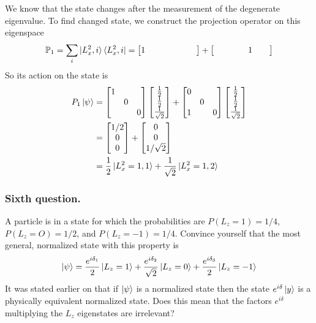 \documentclass[../../../main.tex]{subfiles}
\begin{document}
We know that the state changes after the measurement of the degenerate eigenvalue.
To find changed state, we construct the projection operator on this eigenspace 
\begin{equation*}
    \mathbb{P }_1=\sum_i \ket{L_x^2,i}\bra{L_x^2,i} =
    \begin{bmatrix}
        1&&
        &&
        &&
    \end{bmatrix}
    +
        \begin{bmatrix}
        &&
        &&
        1&&
    \end{bmatrix}
\end{equation*}
So its action on the state is 
\begin{align*}
    P_1 \ket{\psi} &=   \begin{bmatrix}
        1&&\\
        &0&\\
        &&0
    \end{bmatrix}
    \begin{bmatrix}
        \frac{1 }{2} \\ \frac{1 }{2} \\ \frac{1 }{\sqrt{2}}
    \end{bmatrix}
    +
        \begin{bmatrix}
        0&&\\
        &0&\\
        1&&0
    \end{bmatrix}
    \begin{bmatrix}
        \frac{1 }{2} \\ \frac{1 }{2} \\ \frac{1 }{\sqrt{2}}
    \end{bmatrix}\\
    &= 
    \begin{bmatrix}
        1/2\\0\\0
    \end{bmatrix}
    +
        \begin{bmatrix}
        0\\0\\1/\sqrt{2 }
    \end{bmatrix}\\
    &= \frac{1 }{2 }\ket{L_x^2=1,1}+\frac{1 }{\sqrt{2 }}\ket{L_x^2=1,2}
\end{align*}

\subsubsection{Sixth question.}
A particle is in a state for which the probabilities are $P(L_z=1)=1/4$, $P(L_z=O)=1/2$, and $P(L_z =-1)= 1 /4$.
Convince yourself that the most general, normalized state with this property is
\begin{equation*}
    \ket{\psi}=\frac{e^{i\delta_1 }}{2 }\ket{L_z=1}+\frac{e^{i \delta_2 }}{\sqrt{2 }}\ket{L_z=0}+\frac{e^{i \delta_3 }}{2}\ket{L_z=-1}
\end{equation*}
It was stated earlier on that if $\ket{\psi}$ is a normalized state then the state $e^{i\delta}\ket{y}$ is a physically equivalent normalized state.
Does this mean that the factors $e^{i\delta}$ multiplying the $L_z$ eigenstates are irrelevant?
\end{document}
